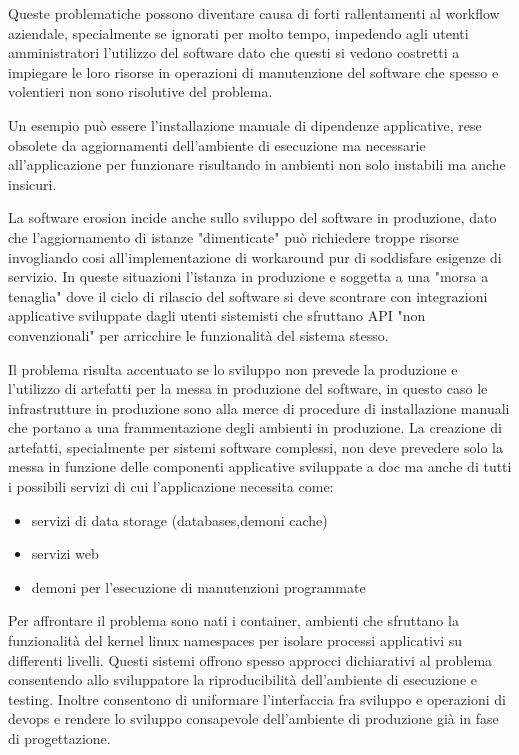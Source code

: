 \documentclass[12pt,a4paper,twoside,openright]{book}
\begin{document}
Queste problematiche possono diventare causa di forti rallentamenti al workflow aziendale, specialmente se ignorati per molto tempo, impedendo agli utenti amministratori l'utilizzo del software dato che questi si vedono costretti a impiegare le loro risorse in operazioni di manutenzione del software che spesso e volentieri non sono risolutive del problema.

Un esempio può essere l'installazione manuale di dipendenze applicative, rese obsolete da aggiornamenti dell'ambiente di esecuzione ma necessarie all'applicazione per funzionare risultando in ambienti non solo instabili ma anche insicuri.

La software erosion incide anche sullo sviluppo del software in produzione, dato che l'aggiornamento di istanze "dimenticate" può richiedere troppe risorse invogliando cosi all'implementazione di workaround pur di soddisfare esigenze di servizio. In queste situazioni l'istanza in produzione e soggetta a una "morsa a tenaglia" dove il ciclo di rilascio del software si deve scontrare con integrazioni applicative sviluppate dagli utenti sistemisti che sfruttano API "non convenzionali" per arricchire le funzionalità del sistema stesso.

Il problema risulta accentuato se lo sviluppo non prevede la produzione e l'utilizzo di artefatti per la messa in produzione del software, in questo caso le infrastrutture in produzione sono alla merce di procedure di installazione manuali che portano a una frammentazione degli ambienti in produzione. La creazione di artefatti, specialmente per sistemi software complessi, non deve prevedere solo la messa in funzione delle componenti applicative sviluppate a doc ma anche di tutti i possibili servizi di cui l'applicazione necessita come:

\begin{itemize}
    \item servizi di data storage (databases,demoni cache)
    \item servizi web
    \item demoni per l'esecuzione di manutenzioni programmate
\end{itemize}

Per affrontare il problema sono nati i container, ambienti che sfruttano la funzionalità del kernel linux namespaces per isolare processi applicativi su differenti livelli. Questi sistemi offrono spesso approcci dichiarativi al problema consentendo allo sviluppatore la riproducibilità dell'ambiente di esecuzione e testing. Inoltre consentono di uniformare l'interfaccia fra sviluppo e operazioni di devops e rendere lo sviluppo consapevole dell'ambiente di produzione già in fase di progettazione.
\end{document}
